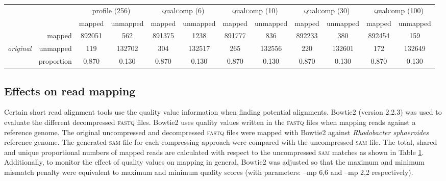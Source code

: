 \documentclass{bioinfo}
\begin{document}
\begin{table}[!tbhp]
\begin{small}
\bigskip

\begin{tabular}{lr|cc|cc|cc|cc|cc}
&  & \multicolumn{2}{c|}{profile (256)} & \multicolumn{2}{c|}{\textsc{q}ual\textsc{c}omp (6)} & \multicolumn{2}{c|}{\textsc{q}ual\textsc{c}omp (10)} & \multicolumn{2}{c|}{\textsc{q}ual\textsc{c}omp (30)} & \multicolumn{2}{c}{\textsc{q}ual\textsc{c}omp (100)} \\
& &  mapped & unmapped & mapped & unmapped & mapped & unmapped & mapped & unmapped & mapped & unmapped \\ 
\cline{2-12}
& mapped & 892051 & 562 & 891375 & 1238 & 891777 & 836 & 892233 & 380 & 892454 & 159 \\ 
{\em original}  & unmapped & 119 & 132702 & 304 & 132517 & 265 & 132556 & 220 & 132601 & 172 & 132649 \\ 
\cline{2-12}
& proportion & 0.870 & 0.130 & 0.870 & 0.130 & 0.870 & 0.130 & 0.870 & 0.130 & 0.870 & 0.130 \\
\end{tabular}
\end{small}

\label{tab:aligner}
\end{table}


\subsection{Effects on read mapping}

Certain short read alignment tools use the quality value information
when finding potential alignments. Bowtie2 (version 2.2.3) was used to
evaluate the different decompressed \textsc{fastq} files. Bowtie2 uses
quality values written in the \textsc{fastq} files when mapping reads
against a reference genome. The original uncompressed and decompressed
\textsc{fastq} files were mapped with Bowtie2 against
\textit{Rhodobacter sphaeroides} reference genome. The generated
\textsc{sam} file for each compressing approach were compared with the
uncompressed \textsc{sam} file. The total, shared and unique
proportional numbers of mapped reads are calculated with respect to
the uncompressed \textsc{sam} matches as shown in Table
\ref{tab:aligner}. Additionally, to monitor the effect of quality
values on mapping in general, Bowtie2 was adjusted so that the maximum
and minimum mismatch penalty were equivalent to maximum and minimum
quality scores (with parameters: --mp 6,6 and --mp 2,2 respectively).
\end{document}
